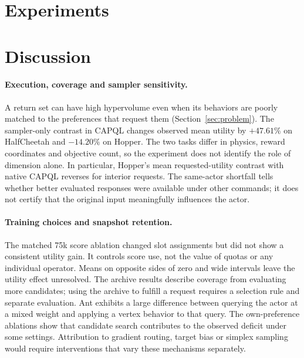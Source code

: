 \documentclass[10pt]{article}
\begin{document}
\section{Experiments}
\label{sec:experiments}



\section{Discussion}
\label{sec:discussion}

\paragraph{Execution, coverage and sampler sensitivity.}
A return set can have high hypervolume even when its behaviors are poorly
matched to the preferences that request them (Section~\ref{sec:problem}).
The sampler-only contrast in CAPQL changes observed mean utility by
$+47.61\%$ on HalfCheetah and $-14.20\%$ on Hopper. The two tasks differ in
physics, reward coordinates and objective count, so the experiment does not
identify the role of dimension alone. In particular, Hopper's mean
requested-utility contrast with native CAPQL reverses for interior
requests. The same-actor shortfall tells whether better evaluated responses
were available under other commands; it does not certify that the
original input meaningfully influences the actor.

\paragraph{Training choices and snapshot retention.}
The matched 75k score ablation changed slot assignments but did not show a
consistent utility gain. It controls score use, not the value of quotas
or any individual operator. Means on opposite sides of zero and wide
intervals leave the utility effect unresolved. The archive results
describe coverage from evaluating more candidates; using the archive to
fulfill a request requires a selection rule and separate evaluation.
Ant exhibits a large difference between querying the actor at a mixed weight
and applying a vertex behavior to that query. The own-preference ablations
show that candidate search contributes to the observed deficit under some
settings. Attribution to gradient routing, target bias or simplex sampling
would require interventions that vary these mechanisms separately.
\end{document}
